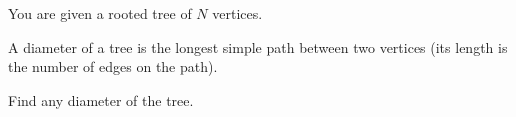 You are given a rooted tree of $N$ vertices.

A diameter of a tree is the longest simple path between two vertices (its length is the number of edges on the path).

Find any diameter of the tree.
